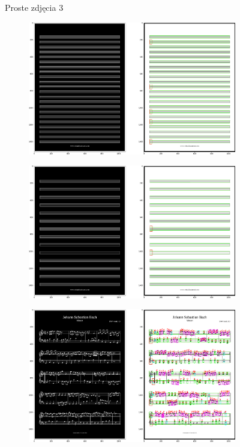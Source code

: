 \documentclass[12pt]{article}
\begin{document}
\begin{enumerate}
\begin{figure}[h!]
\begin{subfigure}[b]{0.48\linewidth}
				\end{subfigure}
				\label{fig:nuuty3}
				\caption{Proste zdjęcia 3}
			\end{figure}
			\begin{figure}[h!]
				\centering
				\begin{subfigure}[b]{0.48\linewidth}
					\includegraphics[width=\linewidth]{Eazy/Zdj30.png}
				\end{subfigure}
				\begin{subfigure}[b]{0.48\linewidth}
					\includegraphics[width=\linewidth]{Eazy/Zdj31.png}
				\end{subfigure}
				\begin{subfigure}[b]{0.48\linewidth}
					\includegraphics[width=\linewidth]{Eazy/Zdj32.png}

\end{subfigure}
\end{figure}
\end{enumerate}
\end{document}
